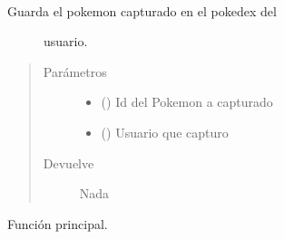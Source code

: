 \documentclass[letterpaper,10pt,spanish,openany,oneside]{sphinxmanual}
\begin{document}

\begin{fulllineitems}
\label{\detokenize{pokemonServer:pokemonServer.guardaEnPokedex}}~\begin{description}
\item[{Guarda el pokemon capturado en el pokedex del}] \leavevmode
usuario.

\end{description}
\begin{quote}\begin{description}
\item[{Parámetros}] \leavevmode\begin{itemize}
\item {} 
 () \textendash{} Id del Pokemon a capturado

\item {} 
 () \textendash{} Usuario que capturo

\end{itemize}

\item[{Devuelve}] \leavevmode
Nada

\end{description}\end{quote}

\end{fulllineitems}


\begin{fulllineitems}
\label{\detokenize{pokemonServer:pokemonServer.main}}
Función principal.

\end{fulllineitems}

\end{document}

